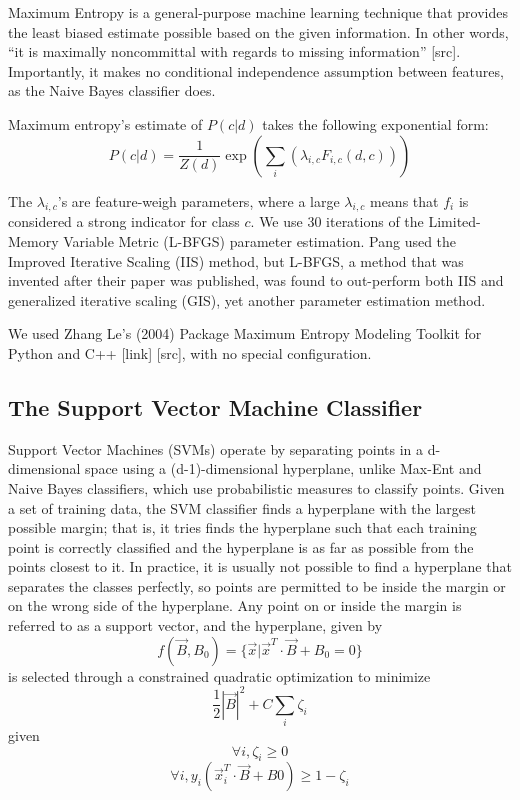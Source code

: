 \documentclass[10pt,twocolumn,letterpaper]{article}
\begin{document}
Maximum Entropy is a general-purpose machine learning technique that provides the least biased estimate possible based on the given information. In other words, “it is maximally noncommittal with regards to missing information” [src]. Importantly, it makes no conditional independence assumption between features, as the Naive Bayes classifier does.

Maximum entropy’s estimate of $P(c|d)$ takes the following exponential form:
$$P(c|d) = \frac{1}{Z(d)} \exp(\sum_i(\lambda_{i,c} F_{i,c}(d,c)))$$

The $\lambda_{i,c}$’s are feature-weigh parameters, where a large $\lambda_{i,c}$ means that $f_i$ is considered a strong indicator for class $c$. We use 30 iterations of the Limited-Memory Variable Metric (L-BFGS) parameter estimation. Pang used the Improved Iterative Scaling (IIS) method, but L-BFGS, a method that was invented after their paper was published, was found to out-perform both IIS and generalized iterative scaling (GIS), yet another parameter estimation method. 

We used Zhang Le’s (2004) Package Maximum Entropy Modeling Toolkit for Python and C++ [link] [src], with no special configuration.

\subsection{The Support Vector Machine Classifier}

Support Vector Machines (SVMs) operate by separating points in a d-dimensional space using a (d-1)-dimensional hyperplane, unlike Max-Ent and Naive Bayes classifiers, which use probabilistic measures to classify points. Given a set of training data, the SVM classifier finds a hyperplane with the largest possible margin; that is, it tries finds the hyperplane such that each training point is correctly classified and the hyperplane is as far as possible from the points closest to it. In practice, it is usually not possible to find a hyperplane that separates the classes perfectly, so points are permitted to be inside the margin or on the wrong side of the hyperplane. Any point on or inside the margin is referred to as a support vector, and the hyperplane, given by
$$f(\vec{B}, B_0) = \{\vec{x} | \vec{x}^T \cdot \vec{B} + B_0 = 0\}$$
is selected through a constrained quadratic optimization to minimize 
$$ \frac{1}{2} |\vec{B}|^2 + C\sum_i \zeta_i$$
given
$$\forall i, \zeta_i \ge 0$$
$$\forall i, y_i  (\vec{x}_i^T \cdot \vec{B} + B0) \ge 1 - \zeta_i $$
\end{document}
